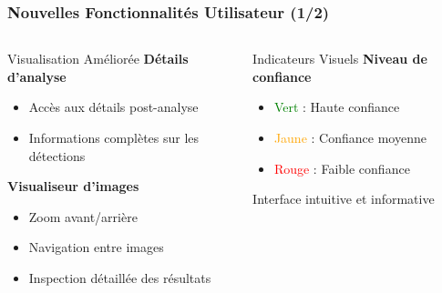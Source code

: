\documentclass[
	11pt,
	aspectratio=169,
]{beamer}
\begin{document}

\begin{frame}
	\frametitle{Nouvelles Fonctionnalités Utilisateur (1/2)}
	
	\begin{columns}[t]
		\begin{column}{0.48\textwidth}
			\begin{block}{Visualisation Améliorée}
				\textbf{Détails d'analyse}
				\begin{itemize}
					\item Accès aux détails post-analyse
					\item Informations complètes sur les détections
				\end{itemize}
				
				\bigskip
				
				\textbf{Visualiseur d'images}
				\begin{itemize}
					\item Zoom avant/arrière
					\item Navigation entre images
					\item Inspection détaillée des résultats
				\end{itemize}
			\end{block}
		\end{column}
		
		\begin{column}{0.48\textwidth}
			\begin{block}{Indicateurs Visuels}
				\textbf{Niveau de confiance}
				\begin{itemize}
					\item \textcolor{green}{Vert} : Haute confiance
					\item \textcolor{orange}{Jaune} : Confiance moyenne
					\item \textcolor{red}{Rouge} : Faible confiance
				\end{itemize}
				
				\bigskip
				
				\alert{Interface intuitive et informative}
			\end{block}
		\end{column}
	\end{columns}
\end{frame}

\end{document}
